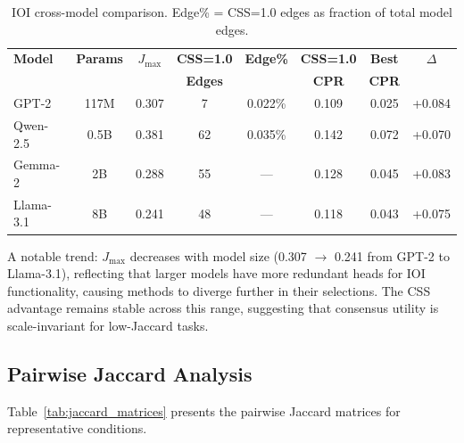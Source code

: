 \documentclass[11pt]{article}
\newcommand{\css}{\textsc{CSS}}
\begin{document}
\begin{table}[t]
\centering
\caption{IOI cross-model comparison. Edge\% = CSS=1.0 edges as fraction of total model edges.}
\label{tab:cross_model}
\small
\begin{tabular}{lccccccc}
\toprule
\textbf{Model} & \textbf{Params} & \textbf{$J_{\max}$} & \textbf{CSS=1.0} & \textbf{Edge\%} & \textbf{CSS=1.0} & \textbf{Best} & \textbf{$\Delta$} \\
 & & & \textbf{Edges} & & \textbf{CPR} & \textbf{CPR} & \\
\midrule
GPT-2 & 117M & 0.307 & 7 & 0.022\% & 0.109 & 0.025 & +0.084 \\
Qwen-2.5 & 0.5B & 0.381 & 62 & 0.035\% & 0.142 & 0.072 & +0.070 \\
Gemma-2 & 2B & 0.288 & 55 & --- & 0.128 & 0.045 & +0.083 \\
Llama-3.1 & 8B & 0.241 & 48 & --- & 0.118 & 0.043 & +0.075 \\
\bottomrule
\end{tabular}
\end{table}

A notable trend: $J_{\max}$ decreases with model size (0.307 $\to$ 0.241 from GPT-2 to Llama-3.1), reflecting that larger models have more redundant heads for IOI functionality, causing methods to diverge further in their selections. The \css{} advantage remains stable across this range, suggesting that consensus utility is scale-invariant for low-Jaccard tasks.

\subsection{Pairwise Jaccard Analysis}
\label{sec:jaccard}

Table~\ref{tab:jaccard_matrices} presents the pairwise Jaccard matrices for representative conditions.
\end{document}
